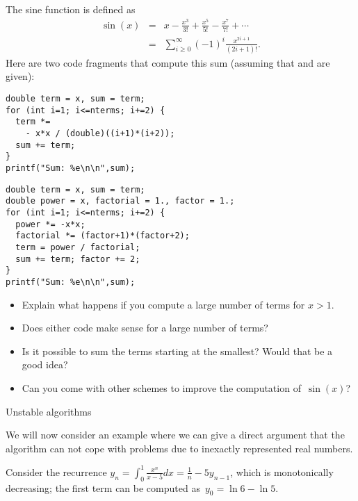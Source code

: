 \begin{exercise}
  \label{ex:sine-power}
  The sine function is defined as
  \begin{equation}
  \begin{array}{rcl}
    \sin(x) &=& x-\frac{x^3}{3!} + \frac{x^5}{5!} - \frac{x^7}{7!} + \cdots\\
    &=& \sum_{i\geq 0}^\infty (-1)^{i}\frac{x^{2i+1}}{(2i+1)!}.
  \end{array}
  \end{equation}
  Here are two code fragments that compute this sum (assuming that 
  and  are given):
  \begin{multicols}{2}
\unitindent=0pt \scriptsize %
\begin{lstlisting}
double term = x, sum = term;
for (int i=1; i<=nterms; i+=2) {
  term *= 
    - x*x / (double)((i+1)*(i+2));
  sum += term;
}
printf("Sum: %e\n\n",sum);
\end{lstlisting}
\columnbreak
\begin{lstlisting}
double term = x, sum = term;
double power = x, factorial = 1., factor = 1.;
for (int i=1; i<=nterms; i+=2) {
  power *= -x*x;
  factorial *= (factor+1)*(factor+2);
  term = power / factorial;
  sum += term; factor += 2;
}
printf("Sum: %e\n\n",sum);
\end{lstlisting}
  \end{multicols}
  \begin{itemize}
  \item
    Explain what happens if you compute a large number of terms for
    $x>1$.
  \item Does either code make sense for a large number of terms?
  \item Is it possible to sum the terms starting at the smallest?
    Would that be a good idea?
  \item Can you come with other schemes to improve the computation
    of~$\sin(x)$?
  \end{itemize}
\end{exercise}

 {Unstable algorithms}

We will now consider an example where we can give a direct argument
that the algorithm can not cope with problems due to inexactly
represented real numbers.

Consider the recurrence
$y_n=\int_0^1 \frac{x^n}{x-5}dx = \frac1n-5y_{n-1}$,
which is monotonically decreasing; the first term can
be computed as~$y_0=\ln 6 - \ln 5$.

